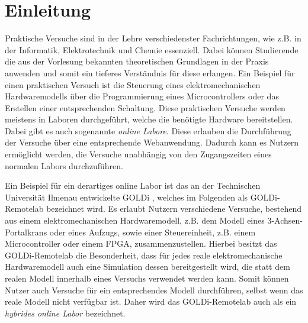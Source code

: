 \chapter{Einleitung}\label{section:einleitung}


Praktische Versuche sind in der Lehre verschiedenster Fachrichtungen, wie z.B. in der Informatik, Elektrotechnik und Chemie essenziell. Dabei können Studierende die aus der Vorlesung bekannten theoretischen Grundlagen in der Praxis anwenden und somit ein tieferes Verständnis für diese erlangen. Ein Beispiel für einen praktischen Versuch ist die Steuerung eines elektromechanischen Hardwaremodells über die Programmierung eines Microcontrollers oder das Erstellen einer entsprechenden Schaltung. Diese praktischen Versuche werden meistens in Laboren durchgeführt, welche die benötigte Hardware bereitstellen. Dabei gibt es auch sogenannte \textit{online Labore}. Diese erlauben die Durchführung der Versuche über eine entsprechende Webanwendung. Dadurch kann es Nutzern ermöglicht werden, die Versuche unabhängig von den Zugangszeiten eines normalen Labors durchzuführen.

Ein Beispiel für ein derartiges online Labor ist das an der Technischen Universität Ilmenau \cite{noauthor_tu-ilmenau_2025} entwickelte \ac{GOLDi} \cite{sitepoint_goldi_nodate}, welches im Folgenden als GOLDi-Remotelab bezeichnet wird. Es erlaubt Nutzern verschiedene Versuche, bestehend aus einem elektromechanischen Hardwaremodell, z.B. dem Modell eines 3-Achsen-Portalkrans oder eines Aufzugs, sowie einer Steuereinheit, z.B. einem Microcontroller oder einem \ac{FPGA}, zusammenzustellen. Hierbei besitzt das GOLDi-Remotelab die Besonderheit, dass für jedes reale elektromechanische Hardwaremodell auch eine Simulation dessen bereitgestellt wird, die statt dem realen Modell innerhalb eines Versuchs verwendet werden kann. Somit können Nutzer auch Versuche für ein entsprechendes Modell durchführen, selbst wenn das reale Modell nicht verfügbar ist. Daher wird das GOLDi-Remotelab auch als ein \textit{hybrides online Labor} bezeichnet.

